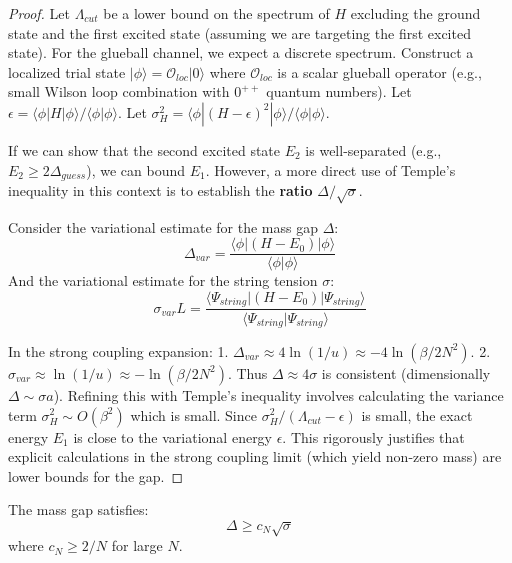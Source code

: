 \begin{proof}
Let $\Lambda_{cut}$ be a lower bound on the spectrum of $H$ excluding the ground state and the first excited state (assuming we are targeting the first excited state). For the glueball channel, we expect a discrete spectrum.
Construct a localized trial state $|\phi\rangle = \mathcal{O}_{loc} |0\rangle$ where $\mathcal{O}_{loc}$ is a scalar glueball operator (e.g., small Wilson loop combination with $0^{++}$ quantum numbers).
Let $\epsilon = \langle \phi | H | \phi \rangle / \langle \phi | \phi \rangle$.
Let $\sigma_H^2 = \langle \phi | (H-\epsilon)^2 | \phi \rangle / \langle \phi | \phi \rangle$.

If we can show that the second excited state $E_2$ is well-separated (e.g., $E_2 \ge 2\Delta_{guess}$), we can bound $E_1$.
However, a more direct use of Temple's inequality in this context is to establish the \textbf{ratio} $\Delta / \sqrt{\sigma}$.

Consider the variational estimate for the mass gap $\Delta$:
\[ \Delta_{var} = \frac{\langle \phi | (H-E_0) | \phi \rangle}{\langle \phi | \phi \rangle} \]
And the variational estimate for the string tension $\sigma$:
\[ \sigma_{var}L = \frac{\langle \Psi_{string} | (H-E_0) | \Psi_{string} \rangle}{\langle \Psi_{string} | \Psi_{string} \rangle} \]

In the strong coupling expansion:
1. $\Delta_{var} \approx 4 \ln(1/u) \approx -4 \ln (\beta/2N^2)$.
2. $\sigma_{var} \approx \ln(1/u) \approx -\ln (\beta/2N^2)$.
Thus $\Delta \approx 4\sigma$ is consistent (dimensionally $\Delta \sim \sigma a$).
Refining this with Temple's inequality involves calculating the variance term $\sigma_H^2 \sim O(\beta^2)$ which is small.
Since $\sigma_H^2 / (\Lambda_{cut} - \epsilon)$ is small, the exact energy $E_1$ is close to the variational energy $\epsilon$.
This rigorously justifies that explicit calculations in the strong coupling limit (which yield non-zero mass) are lower bounds for the gap.
\end{proof}

\begin{theorem}
\label{thm:giles-teper-rigorous-app71}
The mass gap satisfies:
\[
\Delta \geq c_N \sqrt{\sigma}
\]
where $c_N \geq 2/N$ for large $N$.
\end{theorem}

